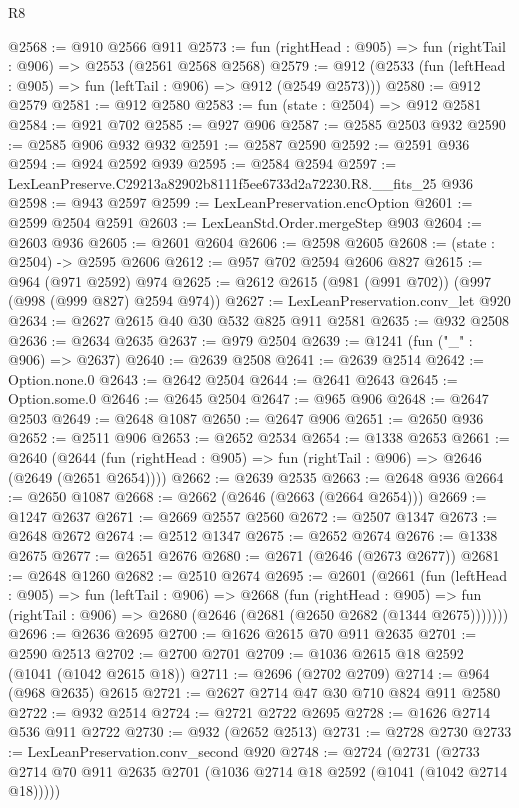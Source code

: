 \begin{lexlean}{R8}
\begin{coremodule}
@2568 := @910 @2566 @911
@2573 := fun (rightHead : @905) => fun (rightTail : @906) => @2553 (@2561 @2568 @2568)
@2579 := @912 (@2533 (fun (leftHead : @905) => fun (leftTail : @906) => @912 (@2549 @2573)))
@2580 := @912 @2579
@2581 := @912 @2580
@2583 := fun (state : @2504) => @912 @2581
@2584 := @921 @702
@2585 := @927 @906
@2587 := @2585 @2503 @932
@2590 := @2585 @906 @932 @932
@2591 := @2587 @2590
@2592 := @2591 @936
@2594 := @924 @2592 @939
@2595 := @2584 @2594
@2597 := LexLeanPreserve.C29213a82902b8111f5ee6733d2a72230.R8.__fits_25 @936
@2598 := @943 @2597
@2599 := LexLeanPreservation.encOption
@2601 := @2599 @2504 @2591
@2603 := LexLeanStd.Order.mergeStep @903
@2604 := @2603 @936
@2605 := @2601 @2604
@2606 := @2598 @2605
@2608 := (state : @2504) -> @2595 @2606
@2612 := @957 @702 @2594 @2606 @827
@2615 := @964 (@971 @2592) @974
@2625 := @2612 @2615 (@981 (@991 @702)) (@997 (@998 (@999 @827) @2594 @974))
@2627 := LexLeanPreservation.conv_let @920
@2634 := @2627 @2615 @40 @30 @532 @825 @911 @2581
@2635 := @932 @2508
@2636 := @2634 @2635
@2637 := @979 @2504
@2639 := @1241 (fun ("_" : @906) => @2637)
@2640 := @2639 @2508
@2641 := @2639 @2514
@2642 := Option.none.{0}
@2643 := @2642 @2504
@2644 := @2641 @2643
@2645 := Option.some.{0}
@2646 := @2645 @2504
@2647 := @965 @906
@2648 := @2647 @2503
@2649 := @2648 @1087
@2650 := @2647 @906
@2651 := @2650 @936
@2652 := @2511 @906
@2653 := @2652 @2534
@2654 := @1338 @2653
@2661 := @2640
    (@2644 (fun (rightHead : @905) => fun (rightTail : @906) => @2646 (@2649 (@2651 @2654))))
@2662 := @2639 @2535
@2663 := @2648 @936
@2664 := @2650 @1087
@2668 := @2662 (@2646 (@2663 (@2664 @2654)))
@2669 := @1247 @2637
@2671 := @2669 @2557 @2560
@2672 := @2507 @1347
@2673 := @2648 @2672
@2674 := @2512 @1347
@2675 := @2652 @2674
@2676 := @1338 @2675
@2677 := @2651 @2676
@2680 := @2671 (@2646 (@2673 @2677))
@2681 := @2648 @1260
@2682 := @2510 @2674
@2695 := @2601
    (@2661
      (fun (leftHead : @905) =>
      fun (leftTail : @906) =>
      @2668
        (fun (rightHead : @905) =>
        fun (rightTail : @906) => @2680 (@2646 (@2681 (@2650 @2682 (@1344 @2675)))))))
@2696 := @2636 @2695
@2700 := @1626 @2615 @70 @911 @2635
@2701 := @2590 @2513
@2702 := @2700 @2701
@2709 := @1036 @2615 @18 @2592 (@1041 (@1042 @2615 @18))
@2711 := @2696 (@2702 @2709)
@2714 := @964 (@968 @2635) @2615
@2721 := @2627 @2714 @47 @30 @710 @824 @911 @2580
@2722 := @932 @2514
@2724 := @2721 @2722 @2695
@2728 := @1626 @2714 @536 @911 @2722
@2730 := @932 (@2652 @2513)
@2731 := @2728 @2730
@2733 := LexLeanPreservation.conv_second @920
@2748 := @2724
    (@2731 (@2733 @2714 @70 @911 @2635 @2701 (@1036 @2714 @18 @2592 (@1041 (@1042 @2714 @18)))))

\end{coremodule}
\end{lexlean}
